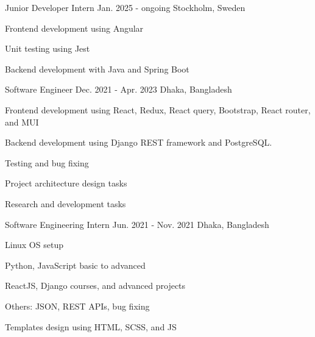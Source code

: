 

\begin{cventries}

  \cventry
    {} %
    {Junior Developer Intern} %
    {Jan. 2025 - ongoing} %
    {Stockholm, Sweden} %
    {
      \begin{cvitems} %
        \item {Frontend development using Angular}
        \item {Unit testing using Jest}
        \item {Backend development with Java and Spring Boot}
      \end{cvitems}
    }

  \cventry
    {} %
    {Software Engineer} %
    {Dec. 2021 - Apr. 2023} %
    {Dhaka, Bangladesh} %
    {
      \begin{cvitems} %
        \item {Frontend development using React, Redux, React query, Bootstrap, React router, and MUI}
        \item {Backend development using Django REST framework and PostgreSQL.}
        \item {Testing and bug fixing}
        \item {Project architecture design tasks}
        \item {Research and development tasks}
      \end{cvitems}
    }

  \cventry
    {} %
    {Software Engineering Intern} %
    {Jun. 2021 - Nov. 2021} %
    {Dhaka, Bangladesh} %
    {
      \begin{cvitems} %
        \item {Linux OS setup}
        \item {Python, JavaScript basic to advanced}
        \item {ReactJS, Django courses, and advanced projects}
        \item {Others: JSON, REST APIs, bug fixing}
        \item {Templates design using HTML, SCSS, and JS}
      \end{cvitems}
    }


\end{cventries}
